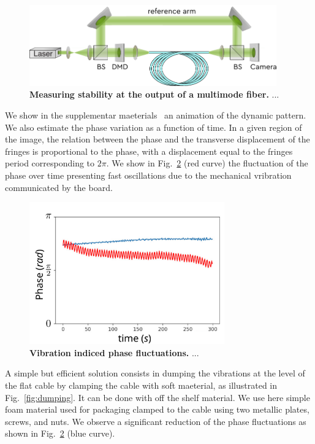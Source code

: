 \documentclass[12pt]{iopart}
\begin{document}
\begin{figure}
  \centering
  \includegraphics[width = 0.95\textwidth]{images/MMF_ref.pdf}
  \caption{
  \textbf{Measuring stability at the output of a multimode fiber.}
 ...
  }
  \label{fig:MMF_ref}
\end{figure}

We show in the supplementar maeterials~\cite{} an animation of the dynamic pattern. 
We also estimate the phase variation as a function of time. 
In a given region of the image, 
the relation between the phase and the transverse displacement of the fringes
is proportional to the phase, 
with a displacement equal to the fringes period corresponding to $2\pi$.
We show in Fig.~\ref{fig:phase_vibrations} (red curve) 
the fluctuation of the phase over time presenting fast oscillations
due to the mechanical vribration communicated by the board.\\

\begin{figure}
  \centering
  \includegraphics[width = 0.75\textwidth]{images/phase_vibrations.pdf}
  \caption{
  \textbf{Vibration indiced phase fluctuations.}
 ...
  }
  \label{fig:phase_vibrations}
\end{figure}

A simple but efficient solution consists in dumping the vibrations
at the level of the flat cable by clamping the cable with soft maeterial, 
as illustrated in Fig.~\ref{fig:dumping}. 
It can be done with off the shelf material.
We use here simple foam material used for packaging clamped to the cable 
using two metallic plates, screws, and nuts.
We observe a significant reduction of the phase fluctuations 
as shown in Fig.~\ref{fig:phase_vibrations} (blue curve).\\
\end{document}
